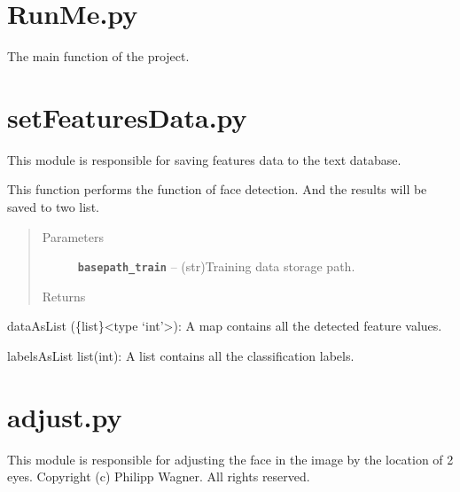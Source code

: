 \documentclass[letterpaper,10pt,english]{sphinxmanual}
\begin{document}
\section{RunMe.py}
\label{Documentation of Code:runme-py}
The main function of the project.


\section{setFeaturesData.py}
\label{Documentation of Code:setfeaturesdata-py}\label{Documentation of Code:module-dataSet.setFeaturesData}
This module is responsible for saving features data to the text database.

\begin{fulllineitems}
\label{Documentation of Code:dataSet.setFeaturesData.getListsFromImages}
This function performs the function of face detection. And the results will be saved to two list.
\begin{quote}\begin{description}
\item[{Parameters}] \leavevmode
\textbf{\texttt{basepath\_train}} -- (str)Training data storage path.

\item[{Returns}] \leavevmode


\end{description}\end{quote}

dataAsList (\{list\}\textless{}type `int'\textgreater{}):  A map contains all the detected feature values.

labelsAsList list(int): A list contains all the classification labels.

\end{fulllineitems}



\section{adjust.py}
\label{Documentation of Code:adjust-py}\label{Documentation of Code:module-preProcess.adjust}
This module is responsible for adjusting the face in the image by the location of 2 eyes.
Copyright (c) Philipp Wagner. All rights reserved.
\end{document}
